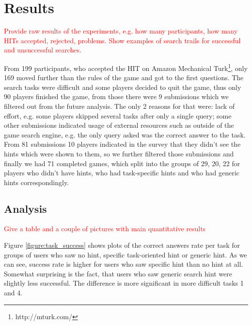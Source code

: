 \documentclass{sig-alternate}
\newcommand\todo[1]{\textcolor{red}{#1}}
\begin{document}
\section{Results}
\todo{Provide raw results of the experiments, e.g. how many participants, how many HITs accepted, rejected, problems. Show examples of search trails for successful and unsuccessful searches}.

From 199 participants, who accepted the HIT on Amazon Mechanical Turk\footnote{http://mturk.com/}, only 169 moved further than the rules of the game and got to the first questions.
The search tasks were difficult and some players decided to quit the game, thus only 90 players finished the game, from those there were 9 submissions which we filtered out from the future analysis.
The only 2 reasons for that were: lack of effort, e.g. some players skipped several tasks after only a single query; some other submissions indicated usage of external resources such as outside of the game search engine, e.g. the only query asked was the correct answer to the task.
From 81 submissions 10 players indicated in the survey that they didn't see the hints which were shown to them, so we further filtered those submissions and finally we had 71 completed games, which split into the groups of 29, 20, 22 for players who didn't have hints, who had task-specific hints and who had generic hints correspondingly.


\subsection{Analysis}
\todo{Give a table and a couple of pictures with main quantitative results}

Figure \ref{figure:task_success} shows plots of the correct answers rate per task for groups of users who saw no hint, specific task-oriented hint or generic hint. As we can see, success rate is higher for users who saw specific hint than no hint at all. Somewhat surprising is the fact, that users who saw generic search hint were slightly less successful. The difference is more significant in more difficult tasks 1 and 4.
\end{document}
